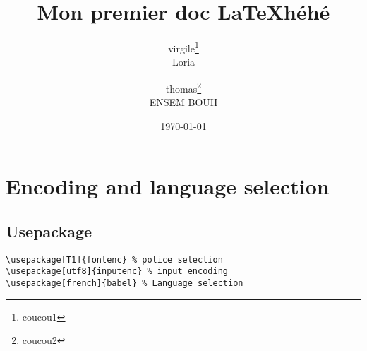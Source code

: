 \documentclass[a4paper,12pt]{article}
\begin{document}
\title{Mon premier doc \LaTeX héhé}
\author{virgile\thanks{coucou1}\\Loria \and thomas\thanks{coucou2}\\ENSEM BOUH}%
\date{\today}

\maketitle
\tableofcontents
%
\newpage
\section{Encoding and language selection}
\subsection{Usepackage}
\begin{verbatim}
\usepackage[T1]{fontenc} % police selection
\usepackage[utf8]{inputenc} % input encoding
\usepackage[french]{babel} % Language selection
\end{verbatim}
\end{document}
